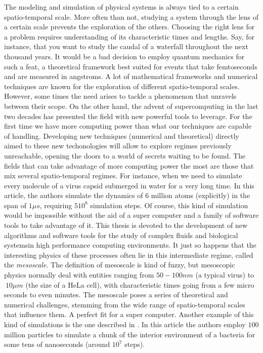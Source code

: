 \documentclass[ twoside,openright,titlepage,numbers=noenddot,%
headinclude,footinclude,cleardoublepage=empty,abstract=on,
BCOR=5mm,paper=a4,fontsize=11pt, dvipsnames
]{scrreprt}
\begin{document}
The modeling and simulation of physical systems is always tied to a certain spatio-temporal scale. More often than not, studying a system through the lens of a certain scale prevents the exploration of the others.
Choosing the right lens for a problem requires understanding of its characteristic times and lengths.
Say, for instance, that you want to study the caudal of a waterfall throughout the next thousand years. It would be a bad decision to employ quantum mechanics for such a feat, a theoretical framework best suited for events that take femtoseconds and are measured in angstroms.
A lot of mathematical frameworks and numerical techniques are known for the exploration of different spatio-temporal scales. However, some times the need arises to tackle a phenomenon that unravels between their scope.
On the other hand, the advent of supercomputing in the last two decades has presented the field with new powerful tools to leverage. For the first time we have more computing power than what our techniques are capable of handling. 
Developing new techniques (numerical and theoretical) directly aimed to these new techonologies will allow to explore regimes previously unreachable, opening the doors to a world of secrets waiting to be found.
The fields that can take advantage of more computing power the most are those that mix several spatio-temporal regimes.
For instance, when we need to simulate every molecule of a virus capsid submerged in water for a very long time\cite{virusfullatom2018}. In this article, the authors simulate the dynamics of $6$ million atoms (explicitly) in the span of $1\mu s$, requiring $5 10^8$ simulation steps.
Of course, this kind of simulation would be impossible without the aid of a super computer and a family of software tools to take advantage of it.
This thesis is devoted to the development of new algorithms and software tools for the study of complex fluids and biological systemsin high performance computing environments. It just so happens that the interesting physics of these processes often lie in this intermediate regime, called the \emph{mesoscale}.
The definition of mesoscale is kind of fuzzy, but mesoscopic physics normally deal with entities ranging from $50-100nm$ (a typical virus) to $~10\mu m$ (the size of a HeLa cell), with characteristic times going from a few micro seconds to even minutes.
The mesoscale poses a series of theoretical and numerical challenges, stemming from the wide range of spatio-temporal scales that influence them. A perfect fit for a super computer.
Another example of this kind of simulations is the one described in \cite{fullatombacteria2016}. In this article the authors employ $100$ million particles to simulate a chunk of the interior environment of a bacteria for some tens of nanoseconds (around $10^7$ steps).
\end{document}
